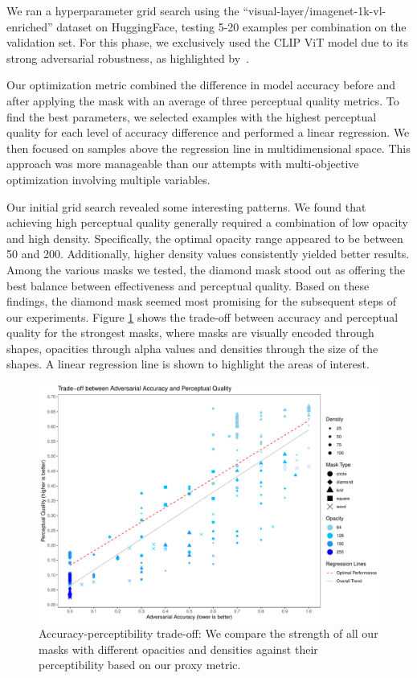 \documentclass[a4paper, oneside]{discothesis}
\begin{document}
We ran a hyperparameter grid search using the ``visual-layer/imagenet-1k-vl-enriched'' dataset on HuggingFace, testing 5-20 examples per combination on the validation set. For this phase, we exclusively used the CLIP ViT model due to its strong adversarial robustness, as highlighted by~\cite{wang2024roz}.

Our optimization metric combined the difference in model accuracy before and after applying the mask with an average of three perceptual quality metrics. To find the best parameters, we selected examples with the highest perceptual quality for each level of accuracy difference and performed a linear regression. We then focused on samples above the regression line in multidimensional space. This approach was more manageable than our attempts with multi-objective optimization involving multiple variables.

Our initial grid search revealed some interesting patterns. We found that achieving high perceptual quality generally required a combination of low opacity and high density. Specifically, the optimal opacity range appeared to be between 50 and 200. Additionally, higher density values consistently yielded better results. Among the various masks we tested, the diamond mask stood out as offering the best balance between effectiveness and perceptual quality. Based on these findings, the diamond mask seemed most promising for the subsequent steps of our experiments. Figure \ref{fig:tradeoff-1} shows the trade-off between accuracy and perceptual quality for the strongest masks, where masks are visually encoded through shapes, opacities through alpha values and densities through the size of the shapes. A linear regression line is shown to highlight the areas of interest.

\begin{figure}
	\centering
	\includegraphics[width=1\columnwidth]{figures/eval_cls_mask_density.pdf}
	\caption{Accuracy-perceptibility trade-off: We compare the strength of all our masks with different opacities and densities against their perceptibility based on our proxy metric.}
	\label{fig:tradeoff-1}
\end{figure}
\end{document}

